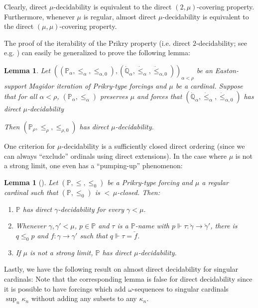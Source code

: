 \documentclass[a4paper]{amsart}
\theoremstyle{definition}
\theoremstyle{remark}
\theoremstyle{plain}
\newtheorem{mylem}[mydef]{Lemma}
\numberwithin{mydef}{section}
\newcommand{\dP}{\mathbb{P}}
\newcommand{\dQ}{\mathbb{Q}}
\begin{document}
	Clearly, direct $\mu$-decidability is equivalent to the direct $(2,\mu)$-covering property. Furthermore, whenever $\mu$ is regular, almost direct $\mu$-decidability is equivalent to the direct $(\mu,\mu)$-covering property.
	
	The proof of the iterability of the Prikry property (i.e. direct $2$-decidability; see e.g. \cite[Lemma 2.4]{JakobLevineFailureApproachability}) can easily be generalized to prove the following lemma:
	
	\begin{mylem}\label{PrikryIterEastonMu}
		Let $((\dP_{\alpha},\leq_{\alpha},\leq_{\alpha,0}),(\dot{\dQ}_{\alpha},\dot{\leq}_{\alpha},\dot{\leq}_{\alpha,0}))_{\alpha<\rho}$ be an Easton-support Magidor iteration of Prikry-type forcings and $\mu$ be a cardinal. Suppose that for all $\alpha<\rho$, $(\dP_{\alpha},\leq_{\alpha})$ preserves $\mu$ and forces that $(\dot{\dQ}_{\alpha},\dot{\leq}_{\alpha},\dot{\leq}_{\alpha,0})$ has direct $\mu$-decidability
		
		Then $(\dP_{\rho},\leq_{\rho},\leq_{\rho,0})$ has direct $\mu$-decidability.
	\end{mylem}
	
	One criterion for $\mu$-decidability is a sufficiently closed direct ordering (since we can always ``exclude'' ordinals using direct extensions). In the case where $\mu$ is not a strong limit, one even has a ``pumping-up'' phenomenon:
	
	\begin{mylem}[{\cite[Lemma 2.6]{JakobLevineFailureApproachability}}]\label{ClosureDecide}
		Let $(\dP,\leq,\leq_0)$ be a Prikry-type forcing and $\mu$ a regular cardinal such that $(\dP,\leq_0)$ is ${<}\,\mu$-closed. Then:
		\begin{enumerate}
			\item $\dP$ has direct $\gamma$-decidability for every $\gamma<\mu$.
			\item Whenever $\gamma,\gamma'<\mu$, $p\in\dP$ and $\tau$ is a $\dP$-name with $p\Vdash\tau\colon\check{\gamma}\to\check{\gamma}'$, there is $q\leq_0p$ and $f\colon\gamma\to\gamma'$ such that $q\Vdash\tau=\check{f}$.
			\item If $\mu$ is not a strong limit, $\dP$ has direct $\mu$-decidability.
		\end{enumerate}
	\end{mylem}
	
	Lastly, we have the following result on almost direct decidability for singular cardinals: Note that the corresponding lemma is false for direct decidability since it is possible to have forcings which add $\omega$-sequences to singular cardinals $\sup_n\kappa_n$ without adding any subsets to any $\kappa_n$.
	
\end{document}
